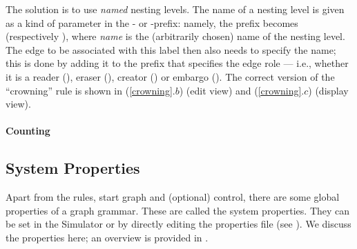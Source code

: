 The solution is to use \emph{named} nesting levels. The name of a nesting level
is given as a kind of parameter in the - or -prefix:
namely, the prefix becomes  (respectively
), where \textsf{\itshape name} is the
(arbitrarily chosen) name of the nesting level. The edge to be associated with
this label then also needs to specify the name; this is done by adding it to
the prefix that specifies the edge role --- i.e., whether it is a reader
(\useP), eraser (\delP), creator (\newP) or embargo (\notP). The correct
version of the ``crowning'' rule is shown in (\eqref{crowning}.$b$) (edit
view) and (\eqref{crowning}.$c$) (display view).

\paragraph{Counting}



\subsection{System Properties}

Apart from the rules, start graph and (optional) control, there are some global
properties of a graph grammar. These are called the system properties. They can
be set in the Simulator or by directly editing
the properties file (see ). We discuss the
properties here; an overview is provided in .

